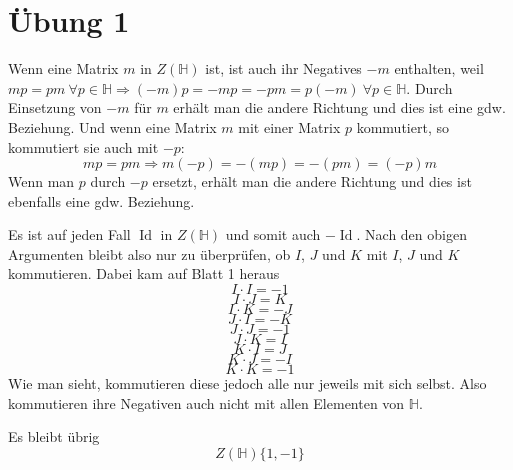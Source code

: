 \documentclass[10pt,a4paper]{article}
\DeclareMathOperator{\id}{Id}
\begin{document}
\section{Übung 1}

Wenn eine Matrix $m$ in $Z(\mathbb{H})$ ist, ist auch ihr Negatives $-m$ enthalten, weil $mp = pm\ \forall p \in \mathbb{H} \Rightarrow (-m)p = -mp = -pm = p(-m)\ \forall p \in \mathbb{H}$.
Durch Einsetzung von $-m$ für $m$ erhält man die andere Richtung und dies ist eine gdw. Beziehung.
Und wenn eine Matrix $m$ mit einer Matrix $p$ kommutiert, so kommutiert sie auch mit $-p$:
\begin{equation}
  mp = pm \Rightarrow m(-p) = -(mp) = -(pm) = (-p)m
\end{equation}
Wenn man $p$ durch $-p$ ersetzt, erhält man die andere Richtung und dies ist ebenfalls eine gdw. Beziehung.

Es ist auf jeden Fall $\id$ in $Z(\mathbb{H})$ und somit auch $-\id$.
Nach den obigen Argumenten bleibt also nur zu überprüfen, ob $I$, $J$ und $K$ mit $I$, $J$ und $K$ kommutieren.
Dabei kam auf Blatt 1 heraus
\begin{equation}
  I \cdot  I = -1
\end{equation}
\begin{equation}
  I \cdot  J = K
\end{equation}
\begin{equation}
  I \cdot K = -J
\end{equation}
\begin{equation}
  J \cdot I = -K
\end{equation}
\begin{equation}
  J \cdot J = -1
\end{equation}
\begin{equation}
  J \cdot K = I
\end{equation}
\begin{equation}
  K \cdot I = J
\end{equation}
\begin{equation}
  K \cdot J = -I
\end{equation}
\begin{equation}
  K \cdot K = -1
\end{equation}
Wie man sieht, kommutieren diese jedoch alle nur jeweils mit sich selbst.
Also kommutieren ihre Negativen auch nicht mit allen Elementen von $\mathbb{H}$.

Es bleibt übrig
\begin{equation}
  Z(\mathbb{H}) \{ 1, -1 \}
\end{equation}
\end{document}
